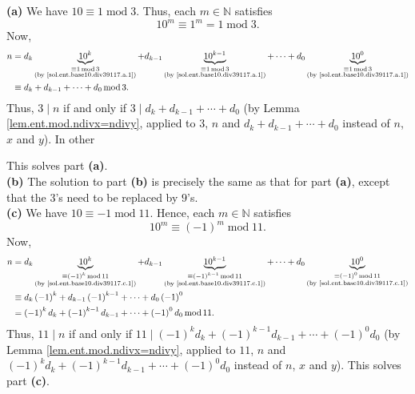 \documentclass[paper=a4, fontsize=12pt]{scrartcl}%
\theoremstyle{plainsl}
\theoremstyle{definition}
\theoremstyle{remark}
\begin{document}
\textbf{(a)} We have $10\equiv1\operatorname{mod}3$. Thus, each $m\in
\mathbb{N}$ satisfies
\begin{equation}
10^{m}\equiv1^{m}=1\operatorname{mod}3. \label{sol.ent.base10.div39117.a.1}%
\end{equation}
Now,%
\begin{align*}
n  &  =d_{k}\underbrace{10^{k}}_{\substack{\equiv1\operatorname{mod}%
3\\\text{(by \eqref{sol.ent.base10.div39117.a.1})}}}+d_{k-1}%
\underbrace{10^{k-1}}_{\substack{\equiv1\operatorname{mod}3\\\text{(by
\eqref{sol.ent.base10.div39117.a.1})}}}+\cdots+d_{0}\underbrace{10^{0}%
}_{\substack{\equiv1\operatorname{mod}3\\\text{(by
\eqref{sol.ent.base10.div39117.a.1})}}}\\
&  \equiv d_{k}+d_{k-1}+\cdots+d_{0}\operatorname{mod}3.
\end{align*}
Thus, $3\mid n$ if and only if $3\mid d_{k}+d_{k-1}+\cdots+d_{0}$ (by Lemma
\ref{lem.ent.mod.ndivx=ndivy}, applied to $3$, $n$ and $d_{k}+d_{k-1}%
+\cdots+d_{0}$ instead of $n$, $x$ and $y$). In other

This solves part \textbf{(a)}. \\[0.4cm]

\textbf{(b)} The solution to part \textbf{(b)} is precisely the same as that
for part \textbf{(a)}, except that the $3$'s need to be replaced by $9$'s.
\\[0.4cm]

\textbf{(c)} We have $10\equiv-1\operatorname{mod}11$. Hence, each
$m\in\mathbb{N}$ satisfies
\begin{equation}
10^{m}\equiv\left(  -1\right)  ^{m}\operatorname{mod}11.
\label{sol.ent.base10.div39117.c.1}%
\end{equation}
Now,%
\begin{align*}
n  &  =d_{k}\underbrace{10^{k}}_{\substack{\equiv\left(  -1\right)
^{k}\operatorname{mod}11\\\text{(by \eqref{sol.ent.base10.div39117.c.1})}%
}}+d_{k-1}\underbrace{10^{k-1}}_{\substack{\equiv\left(  -1\right)
^{k-1}\operatorname{mod}11\\\text{(by \eqref{sol.ent.base10.div39117.c.1})}%
}}+\cdots+d_{0}\underbrace{10^{0}}_{\substack{\equiv\left(  -1\right)
^{0}\operatorname{mod}11\\\text{(by \eqref{sol.ent.base10.div39117.c.1})}}}\\
&  \equiv d_{k}\left(  -1\right)  ^{k}+d_{k-1}\left(  -1\right)  ^{k-1}%
+\cdots+d_{0}\left(  -1\right)  ^{0}\\
&  =\left(  -1\right)  ^{k}d_{k}+\left(  -1\right)  ^{k-1}d_{k-1}%
+\cdots+\left(  -1\right)  ^{0}d_{0}\operatorname{mod}11.
\end{align*}
Thus, $11\mid n$ if and only if $11\mid\left(  -1\right)  ^{k}d_{k}+\left(
-1\right)  ^{k-1}d_{k-1}+\cdots+\left(  -1\right)  ^{0}d_{0}$ (by Lemma
\ref{lem.ent.mod.ndivx=ndivy}, applied to $11$, $n$ and $\left(  -1\right)
^{k}d_{k}+\left(  -1\right)  ^{k-1}d_{k-1}+\cdots+\left(  -1\right)  ^{0}%
d_{0}$ instead of $n$, $x$ and $y$). This solves part \textbf{(c)}. \\[0.4cm]
\end{document}
